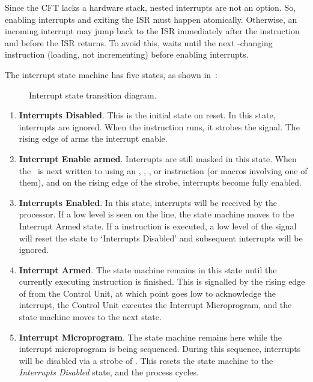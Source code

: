 Since the CFT lacks a hardware stack, nested interrupts are not an option. So,
enabling interrupts and exiting the ISR must happen atomically. Otherwise, an
incoming interrupt may jump back to the ISR immediately after the 
instruction and before the ISR returns. To avoid this,  waits until
the next \PC-changing instruction (loading, not incrementing) before
enabling interrupts.

The interrupt state machine has five states, as shown
in~:

\begin{figure}
  \centering
  \caption[CFT Processor Interrupt State Machine]{\label{hard:proc:interrupt-fsm}Interrupt state transition diagram.}
\end{figure}

\begin{enumerate}

\item {\bf Interrupts Disabled}. This is the initial state on reset. In this
  state, interrupts are ignored. When the  instruction runs, it
  strobes the  signal. The rising edge of  arms the interrupt
  enable.

\item {\bf Interrupt Enable armed}. Interrupts are still masked in this
  state. When the \PC~is next written to using an , ,
  ,  or  instruction (or macros involving one of
  them), and on the rising edge of the  strobe, interrupts become
  fully enabled.

\item {\bf Interrupts Enabled}. In this state, interrupts will be received by
  the processor. If a low level is seen on the  line, the state machine
  moves to the Interrupt Armed state. If a  instruction is executed, a
  low level of the  signal will reset the state to ‘Interrupts
  Disabled’ and subsequent interrupts will be ignored.

\item {\bf Interrupt Armed}. The state machine remains in this state until the
  currently executing instruction is finished. This is signalled by the rising
  edge of  from the Control Unit, at which point  goes low to
  acknowledge the interrupt, the Control Unit executes the Interrupt
  Microprogram, and the state machine moves to the next state.

\item {\bf Interrupt Microprogram}. The state machine remains here while the
  interrupt microprogram is being sequenced. During this sequence, interrupts
  will be disabled via a strobe of . This resets the state machine to
  the {\em Interrupts Disabled\/} state, and the process cycles.

\end{enumerate}

